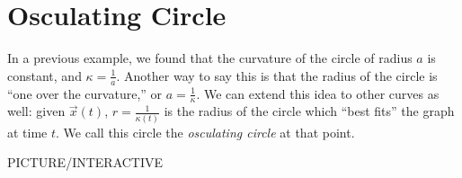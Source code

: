 \documentclass{ximera}
\begin{document}
\section*{Osculating Circle}

In a previous example, we found that the curvature of the circle of radius $a$ is constant, and $\kappa = \frac{1}{a}$. Another way to say this is that the radius of the circle is ``one over the curvature,'' or $a = \frac{1}{\kappa}$. We can extend this idea to other curves as well: given $\vec{x}(t)$, $r = \frac{1}{\kappa(t)}$ is the radius of the circle which ``best fits'' the graph at time $t$. We call this circle the \emph{osculating circle} at that point.

PICTURE/INTERACTIVE
\end{document}
